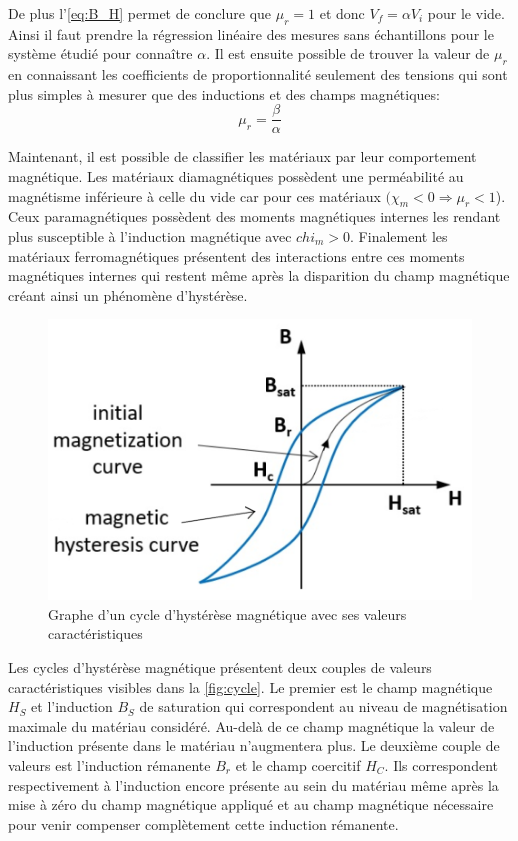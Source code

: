 De plus l'\autoref{eq:B_H} permet de conclure que \(\mu_r = 1\) et donc \(V_f = \alpha V_i\) pour le vide. Ainsi il faut prendre la régression linéaire des mesures sans échantillons pour le système étudié pour connaître \(\alpha\). Il est ensuite possible de trouver la valeur de \(\mu_r\) en connaissant les coefficients de proportionnalité seulement des tensions qui sont plus simples à mesurer que des inductions et des champs magnétiques:
\begin{equation} 
    \mu_r = \frac{\beta}{\alpha}
    \label{eq:mu_r}
\end{equation} 


Maintenant, il est possible de classifier les matériaux par leur comportement magnétique. Les matériaux diamagnétiques possèdent une perméabilité au magnétisme inférieure à celle du vide car pour ces matériaux \((\chi_m < 0 \Rightarrow \mu_r < 1\)). Ceux paramagnétiques possèdent des moments magnétiques internes les rendant plus susceptible à l'induction magnétique avec \(chi_m > 0\). Finalement les matériaux ferromagnétiques présentent des interactions entre ces moments magnétiques internes qui restent même après la disparition du champ magnétique créant ainsi un phénomène d'hystérèse.

\begin{figure}
    \centering
    \includegraphics[width=0.7\linewidth]{figures/cycle_hysterese.png}
    \caption{Graphe d'un cycle d'hystérèse magnétique avec ses valeurs caractéristiques \cite{graph_cycle}}
    \label{fig:cycle}
\end{figure}

Les cycles d'hystérèse magnétique présentent deux couples de valeurs caractéristiques visibles dans la \autoref{fig:cycle}. Le premier est le champ magnétique \(H_S\) et l'induction \(B_S\) de saturation qui correspondent au niveau de magnétisation maximale du matériau considéré. Au-delà de ce champ magnétique la valeur de l'induction présente dans le matériau n'augmentera plus. Le deuxième couple de valeurs est l'induction rémanente \(B_r\) et le champ coercitif \(H_C\). Ils correspondent respectivement à l'induction encore présente au sein du matériau même après la mise à zéro du champ magnétique appliqué et au champ magnétique nécessaire pour venir compenser complètement cette induction rémanente.